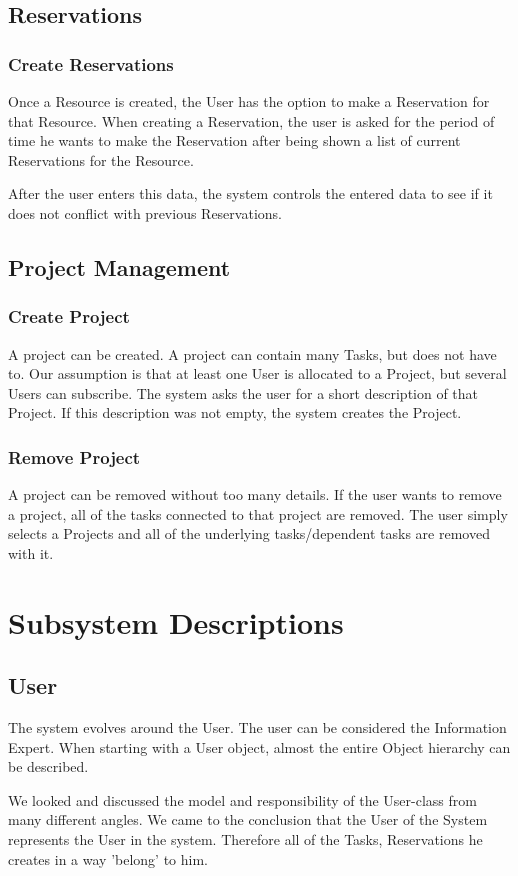 		\subsection{Reservations}
			\subsubsection{Create Reservations}
			Once a Resource is created, the User has the option to make a Reservation for that Resource.
			When creating a Reservation, the user is asked for the period of time he wants to make the Reservation after being shown a list of current Reservations for the Resource.

			After the user enters this data, the system controls the entered data to see if it does not conflict with previous Reservations.
		\subsection{Project Management}
			\subsubsection{Create Project}
			A project can be created. A project can contain many Tasks, but does not have to. Our assumption is that at least one User is allocated to a Project, but several Users can subscribe.
			The system asks the user for a short description of that Project. If this description was not empty, the system creates the Project.
			\subsubsection{Remove Project}
			A project can be removed without too many details. If the user wants to remove a project, all of the tasks connected to that project are removed. The user simply selects a Projects and all of the underlying tasks/dependent tasks are removed with it.
	\section{Subsystem Descriptions}
		\subsection{User}
		The system evolves around the User. The user can be considered the Information Expert.
		When starting with a User object, almost the entire Object hierarchy can be described.

		We looked and discussed the model and responsibility of the User-class from many different angles. We came to the conclusion that the User of the System represents the User in the system. Therefore all of the Tasks, Reservations he creates in a way 'belong' to him.

